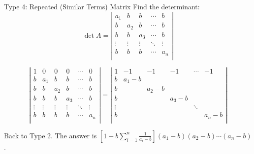 \documentclass{beamer}
\begin{document}
\begin{frame}{Type 4: Repeated (Similar Terms) Matrix}
Find the determinant:
\begin{equation*}
    \det A=\left| \begin{matrix}
        a_1&		b&		b&		\cdots&		b\\
        b&		a_2&		b&		\cdots&		b\\
        b&		b&		a_3&		\cdots&		b\\
        \vdots&		\vdots&		\vdots&		\ddots&		\vdots\\
        b&		b&		b&		\cdots&		a_n\\
    \end{matrix} \right|
\end{equation*}

\begin{equation*}
    \left| \begin{matrix}
        1&		0&		0&		0&		\cdots&		0\\
        b&		a_1&		b&		b&		\cdots&		b\\
        b&		b&		a_2&		b&		\cdots&		b\\
        b&		b&		b&		a_3&		\cdots&		b\\
        \vdots&		\vdots&		\vdots&		\vdots&		\ddots&		\vdots\\
        b&		b&		b&		b&		\cdots&		a_n\\
    \end{matrix} \right|=\left| \begin{matrix}
        1&		-1&		-1&		-1&		\cdots&		-1\\
        b&		a_1-b&		&		&		&		\\
        b&		&		a_2-b&		&		&		\\
        b&		&		&		a_3-b&		&		\\
        \vdots&		&		&		&		\ddots&		\\
        b&		&		&		&		&		a_n-b\\
    \end{matrix} \right|
\end{equation*}

Back to Type 2. The answer is $\left[ 1+b\sum_{i=1}^n{\frac{1}{a_i-b}} \right] \left( a_1-b \right) \left( a_2-b \right) \cdots \left( a_n-b \right)$.
\end{frame}
\end{document}
